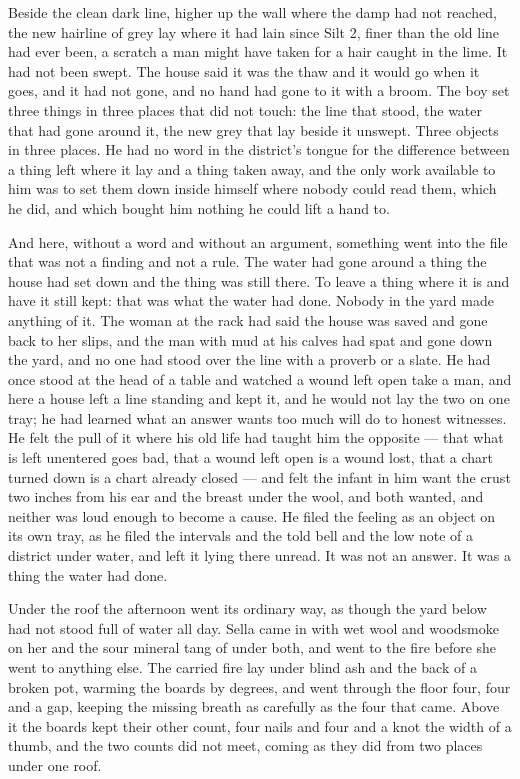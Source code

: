 Beside the clean dark line, higher up the wall where the damp had not reached, the new hairline of grey lay where it had lain since Silt 2, finer than the old line had ever been, a scratch a man might have taken for a hair caught in the lime. It had not been swept. The house said it was the thaw and it would go when it goes, and it had not gone, and no hand had gone to it with a broom. The boy set three things in three places that did not touch: the line that stood, the water that had gone around it, the new grey that lay beside it unswept. Three objects in three places. He had no word in the district's tongue for the difference between a thing left where it lay and a thing taken away, and the only work available to him was to set them down inside himself where nobody could read them, which he did, and which bought him nothing he could lift a hand to.

And here, without a word and without an argument, something went into the file that was not a finding and not a rule. The water had gone around a thing the house had set down and the thing was still there. To leave a thing where it is and have it still kept: that was what the water had done. Nobody in the yard made anything of it. The woman at the rack had said the house was saved and gone back to her slips, and the man with mud at his calves had spat and gone down the yard, and no one had stood over the line with a proverb or a slate. He had once stood at the head of a table and watched a wound left open take a man, and here a house left a line standing and kept it, and he would not lay the two on one tray; he had learned what an answer wants too much will do to honest witnesses. He felt the pull of it where his old life had taught him the opposite — that what is left unentered goes bad, that a wound left open is a wound lost, that a chart turned down is a chart already closed — and felt the infant in him want the crust two inches from his ear and the breast under the wool, and both wanted, and neither was loud enough to become a cause. He filed the feeling as an object on its own tray, as he filed the intervals and the told bell and the low note of a district under water, and left it lying there unread. It was not an answer. It was a thing the water had done.

\scenebreak

Under the roof the afternoon went its ordinary way, as though the yard below had not stood full of water all day. Sella came in with wet wool and woodsmoke on her and the sour mineral tang of  under both, and went to the fire before she went to anything else. The carried fire lay under blind ash and the back of a broken pot, warming the boards by degrees, and  went through the floor four, four and a gap, keeping the missing breath as carefully as the four that came. Above it the boards kept their other count, four nails and four and a knot the width of a thumb, and the two counts did not meet, coming as they did from two places under one roof.

